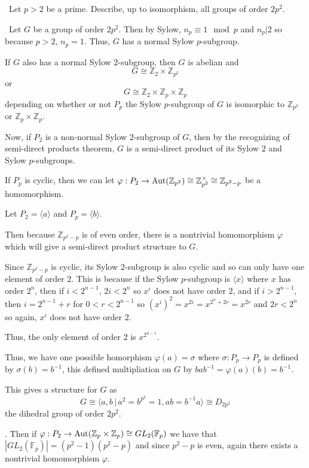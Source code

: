 \documentclass[12pt]{AlgebraQual}
\begin{document}
\begin{problem} $\,$
Let $p>2$ be a prime. Describe, up to isomorphism, all groups of order $2p^2$.
\end{problem}


\begin{solution}$\,$
Let $G$ be a group of order $2p^2$. Then by Sylow, $n_p\equiv 1\mod p$ and $n_p|2$ so because $p>2$, $n_p=1$. Thus, $G$ has a normal Sylow $p$-subgroup.

 If $G$ also has a normal Sylow $2$-subgroup, then $G$ is abelian and $$G\cong\mathbb{Z}_2\times\mathbb{Z}_{p^2}$$ or $$G\cong\mathbb{Z}_2\times\mathbb{Z}_p\times\mathbb{Z}_p$$ depending on whether or not $P_p$ the Sylow $p$-subgroup of $G$ is isomorphic to $\mathbb{Z}_{p^2}$ or $\mathbb{Z}_p\times\mathbb{Z}_p$.

Now, if $P_2$ is a non-normal Sylow $2$-subgroup of $G$, then by the recognizing of semi-direct products theorem, $G$ is a semi-direct product of its Sylow $2$ and Sylow $p$-subgroups.

 If $P_p$ is cyclic, then we can let $\varphi:P_2\to\text{Aut}(\mathbb{Z}_{p^2})\cong\mathbb{Z}_{p^2}^\times\cong\mathbb{Z}_{p^2-p}$ be a homomorphism.

Let $P_2=\langle a\rangle$ and $P_p=\langle b\rangle.$

Then because $\mathbb{Z}_{p^2-p}$ is of even order, there is a nontrivial homomorphism $\varphi$ which will give a semi-direct product structure to $G.$

Since $\mathbb{Z}_{p^2-p}$ is cyclic, its Sylow $2$-subgroup is also cyclic and so can only have one element of order $2$. This is because if the Sylow $p$-subgroup is $\langle x\rangle$ where $x$ has order $2^n$, then if $i<2^{n-1}$, $2i<2^n$ so $x^i$ does not have order $2$, and if $i>2^{n-1}$, then $i=2^{n-1}+r$ for $0<r<2^{n-1}$ so $(x^i)^2=x^{2i}=x^{2^n+2r}=x^{2r}$ and $2r<2^n$ so again, $x^i$ does not have order $2$.

Thus, the only element of order $2$ is $x^{2^{n-1}}$.

Thus, we have one possible homorphism $\varphi(a)=\sigma$ where $\sigma:P_p\to P_p$ is defined by $\sigma(b)=b^{-1}$, this defined multipliation on $G$ by $bab^{-1}=\varphi(a)(b)=b^{-1}$.

This gives a structure for $G$ as $$G\cong\langle a,b\,|\,a^2=b^{p^2}=1,ab=b^{-1}a\rangle\cong D_{2p^2}$$ the dihedral group of order $2p^2$.

. Then if $\varphi:P_2\to\text{Aut}(\mathbb{Z}_p\times\mathbb{Z}_p)\cong GL_2(\mathbb{F}_p)$ we have that $|GL_2(\mathbb{F}_p)|=(p^2-1)(p^2-p)$ and since $p^2-p$ is even, again there exists a nontrivial homomorphism $\varphi.$


\end{solution}
\end{document}
